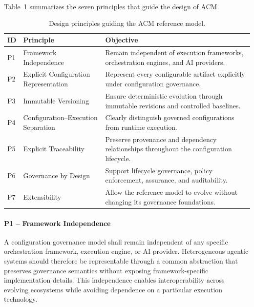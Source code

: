 \documentclass[10pt]{article}
\begin{document}
Table~\ref{tab:design_principles} summarizes the seven principles that guide the design of ACM.
\begin{table}[t]
\centering
\caption{Design principles guiding the ACM reference model.}
\label{tab:design_principles}

\renewcommand{\arraystretch}{1.15}

\begin{tabular}{p{1.0cm}p{4.0cm}p{9.2cm}}
\toprule
\textbf{ID} &
\textbf{Principle} &
\textbf{Objective}
\\
\midrule

P1 &
Framework Independence &
Remain independent of execution frameworks, orchestration engines, and AI providers.\\

P2 & Explicit Configuration Representation & Represent every configurable artifact explicitly under configuration governance.\\

P3 &  Immutable Versioning & Ensure deterministic evolution through immutable revisions and controlled baselines. \\

P4 & Configuration–Execution Separation & Clearly distinguish governed configurations from runtime execution.\\

P5 & Explicit Traceability & Preserve provenance and dependency relationships throughout the configuration lifecycle.\\

P6 & Governance by Design & Support lifecycle governance, policy enforcement, assurance, and auditability.\\

P7 & Extensibility & Allow the reference model to evolve without changing its governance foundations.
\\
\bottomrule
\end{tabular}

\end{table}

\paragraph{P1 -- Framework Independence}

A configuration governance model shall remain independent of any specific orchestration framework, execution engine, or AI provider. Heterogeneous agentic systems should therefore be representable through a common abstraction that preserves governance semantics without exposing framework-specific implementation details. This independence enables interoperability across evolving ecosystems while avoiding dependence on a particular execution technology.
\end{document}

